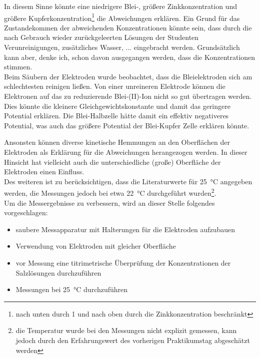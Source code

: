\documentclass{article}
\begin{document}
      In diesem Sinne könnte eine niedrigere Blei-, größere Zinkkonzentration und größere Kupferkonzentration\footnote{nach unten durch 1 und nach oben durch die Zinkkonzentration beschränkt} die Abweichungen erklären. Ein Grund für das Zustandekommen der abweichenden Konzentrationen könnte sein, dass durch die nach Gebrauch wieder zurückgeleerten Lösungen der Studenten Verunreinigungen, zusätzliches Wasser, ... eingebracht werden. Grundsätzlich kann aber, denke ich, schon davon ausgegangen werden, dass die Konzentrationen stimmen. \\
      
      Beim Säubern der Elektroden wurde beobachtet, dass die Bleielektroden sich am schlechtesten reinigen ließen. Von einer unreineren Elektrode können die Elektronen auf das zu reduzierende Blei-(II)-Ion nicht so gut übertragen werden. Dies könnte die kleinere Gleichgewichtskonstante und damit das geringere Potential erklären. Die Blei-Halbzelle hätte damit ein effektiv negativeres Potential, was auch das größere Potential der Blei-Kupfer Zelle erklären könnte. 
      
      Ansonsten können diverse kinetische Hemmungen an den Oberflächen der Elektroden als Erklärung für die Abweichungen herangezogen werden. In dieser Hinsicht hat vielleicht auch die unterschiedliche (große) Oberfläche der Elektroden einen Einfluss. \\
      
      Des weiteren ist zu berücksichtigen, dass die Literaturwerte für \SI[mode=text]{25}{\degreeCelsius} angegeben werden, die Messungen jedoch bei etwa \SI[mode=text]{22}{\degreeCelsius} durchgeführt wurden\footnote{die Temperatur wurde bei den Messungen nicht explizit gemessen, kann jedoch durch den Erfahrungswert des vorherigen Praktikumstag abgeschätzt werden}. \\
      
      Um die Messergebnisse zu verbessern, wird an dieser Stelle folgendes vorgeschlagen: 
      
      \begin{itemize}
        \item saubere Messapparatur mit Halterungen für die Elektroden aufzubauen
        \item Verwendung von Elektroden mit gleicher Oberfläche
        \item vor Messung eine titrimetrische Überprüfung der Konzentrationen der Salzlösungen durchzuführen
        \item Messungen bei \SI[mode=text]{25}{\degreeCelsius} durchzuführen
      \end{itemize}
    
\end{document}
